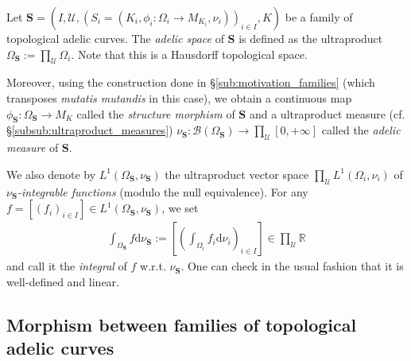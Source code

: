 \documentclass [11pt,reqno]{amsart}
\def\bR{{\mathbb{R}}}
\newcommand{\1}{\mathmybb{1}}
\def\cB{{\mathcal{B}}}
\def\cU{{\mathcal{U}}}
\def\diff{\mathrm{d}}
\begin{document}
\begin{definition}
\label{label:adelic_space_family_tac}
Let $\mathbf{S}=(I,\cU,(S_{i}=(K_{i},\phi_{i}:\Omega_{i}\to M_{K_{i}},\nu_{i}))_{i\in I},K)$ be a family of topological adelic curves. The \emph{adelic space} of $\mathbf{S}$ is defined as the ultraproduct $\Omega_{\mathbf{S}}:=\prod_{\cU}\Omega_{i}$. Note that this is a Hausdorff topological space. 

Moreover, using the construction done in \S \ref{sub:motivation_families} (which transposes \emph{mutatis mutandis} in this case), we obtain a continuous map $\phi_{\mathbf{S}}:\Omega_{\mathbf{S}}\to M_{K}$ called the \emph{structure morphism} of $\mathbf{S}$ and a ultraproduct measure (cf. \S \ref{subsub:ultraproduct_measures}) $\nu_{\mathbf{S}} : \cB(\Omega_{\mathbf{S}})\to\prod_{\cU}[0,+\infty]$ called the \emph{adelic measure} of $\mathbf{S}$. 

We also denote by $L^{1}(\Omega_{\mathbf{S}},\nu_{\mathbf{S}})$ the ultraproduct vector space $\prod_{\cU}L^{1}(\Omega_{i},\nu_{i})$ of $\nu_{\mathbf{S}}$\emph{-integrable functions} (modulo the null equivalence). For any $f=[(f_{i})_{i\in I}]\in L^{1}(\Omega_{\mathbf{S}},\nu_{\mathbf{S}})$, we set
\begin{align*}
\int_{\Omega_{\mathbf{S}}}f\diff\nu_{\mathbf{S}} := \left[\left(\int_{\Omega_{i}}f_{i}\diff\nu_{i}\right)_{i\in I}\right]\in \displaystyle\prod_{\cU}\bR
\end{align*}
and call it the \emph{integral} of $f$ w.r.t. $\nu_{\mathbf{S}}$. One can check in the usual fashion that it is well-defined and linear.
\end{definition}

\subsection{Morphism between families of topological adelic curves}
\label{sub:morphism_family_tac}
\end{document}
